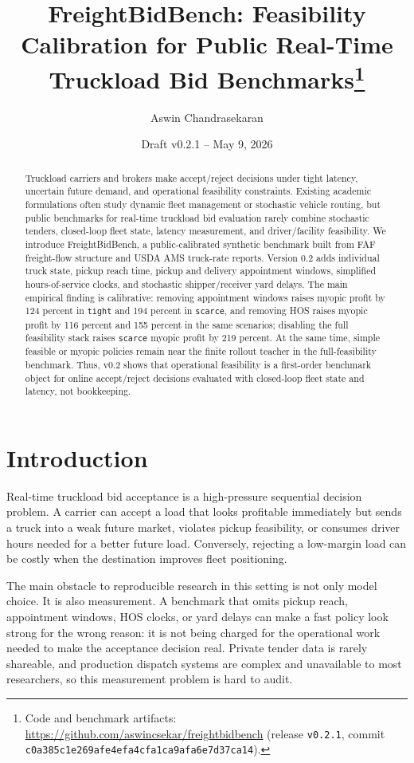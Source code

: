 \documentclass[11pt]{article}
\title{FreightBidBench: Feasibility Calibration for Public Real-Time Truckload Bid Benchmarks\thanks{Code and benchmark artifacts: \url{https://github.com/aswincsekar/freightbidbench} (release \texttt{v0.2.1}, commit \texttt{c0a385c1e269afe4efa4cfa1ca9afa6e7d37ca14}).}}
\author{Aswin Chandrasekaran}
\date{Draft v0.2.1 -- May 9, 2026}
\begin{document}
\maketitle

\begin{abstract}
Truckload carriers and brokers make accept/reject decisions under tight
latency, uncertain future demand, and operational feasibility constraints.
Existing academic formulations often study dynamic fleet management or
stochastic vehicle routing, but public benchmarks for real-time truckload bid
evaluation rarely combine stochastic tenders, closed-loop fleet state, latency
measurement, and driver/facility feasibility. We introduce FreightBidBench, a
public-calibrated synthetic benchmark built from FAF freight-flow structure and
USDA AMS truck-rate reports. Version 0.2 adds individual truck state, pickup
reach time, pickup and delivery appointment windows, simplified
hours-of-service clocks, and stochastic shipper/receiver yard delays. The main
empirical finding is calibrative: removing appointment windows raises myopic
profit by 124 percent in \texttt{tight} and 194 percent in \texttt{scarce}, and
removing HOS raises myopic profit by 116 percent and 155 percent in the same
scenarios; disabling the full feasibility stack raises \texttt{scarce} myopic
profit by 219 percent. At the same time, simple feasible or myopic policies
remain near the finite rollout teacher in the full-feasibility benchmark. Thus,
v0.2 shows that operational feasibility is a first-order benchmark object for
online accept/reject decisions evaluated with closed-loop fleet state and
latency, not bookkeeping.
\end{abstract}

\section{Introduction}

Real-time truckload bid acceptance is a high-pressure sequential decision
problem. A carrier can accept a load that looks profitable immediately but
sends a truck into a weak future market, violates pickup feasibility, or
consumes driver hours needed for a better future load. Conversely, rejecting a
low-margin load can be costly when the destination improves fleet positioning.

The main obstacle to reproducible research in this setting is not only model
choice. It is also measurement. A benchmark that omits pickup reach,
appointment windows, HOS clocks, or yard delays can make a fast policy look
strong for the wrong reason: it is not being charged for the operational work
needed to make the acceptance decision real. Private tender data is rarely
shareable, and production dispatch systems are complex and unavailable to most
researchers, so this measurement problem is hard to audit.
\end{document}
